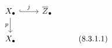 \documentclass[crop,dvisvgm]{standalone}
\begin{document}
\[\begin {tikzcd}
        X_\bullet 
          \ar [r,hook,"j"]
          \ar [d,swap,"p"]
        & \overline {Z}_\bullet 
      \\X_\bullet 
        && (8.3.1.1)
      \end {tikzcd}\]
\end{document}
